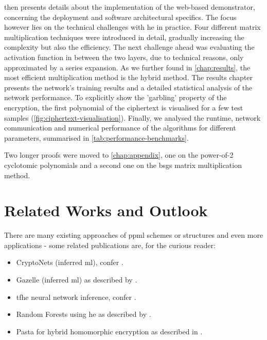  then presents details about the implementation of the web-based demonstrator, concerning the deployment and software architectural specifics.
The focus however lies on the technical challenges with \glsdesc{he} in practice.
Four different matrix multiplication techniques were introduced in detail, gradually increasing the complexity but also the efficiency.
The next challenge ahead was evaluating the activation function in between the two layers, due to technical reasons, only approximated by a series expansion.
As we further found in \cref{chap:results}, the most efficient multiplication method is the hybrid method.
The results chapter presents the network's training results and a detailed statistical analysis of the network performance.
To explicitly show the 'garbling' property of the encryption, the first polynomial of the ciphertext is visualised for a few test samples (\cref{fig:ciphertext-visualisation}).
Finally, we analysed the runtime, network communication and numerical performance of the algorithms for different parameters, summarised in \cref{tab:performance-benchmarks}.

Two longer proofs were moved to \cref{chap:appendix}, one on the power-of-2 cyclotomic polynomials and a second one on the \gls{bsgs} matrix multiplication method.

\section{Related Works and Outlook}
There are many existing approaches of \gls{ppml} schemes or structures and even more applications - some related publications are, for the curious reader:
\begin{itemize}[noitemsep]
  \item CryptoNets (inferred \gls{ml}), confer \cite{2016-cryptonets}.
  \item Gazelle (inferred \gls{ml}) as described by \cite{2018-gazelle}.
  \item \gls{tfhe} neural network inference, confer \cite{2019-tfhe-original}.
  \item Random Forests using \gls{he} as described by \cite{2020-cryptotree}.
  \item Pasta for hybrid homomorphic encryption as described in \cite{2021-pasta}.
\end{itemize}

